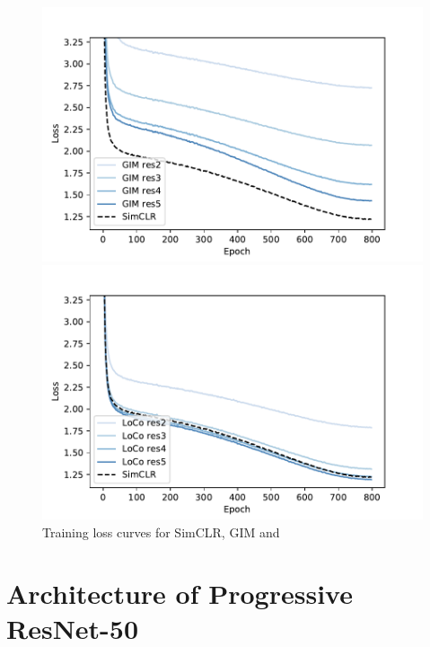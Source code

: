\else
    \begin{figure}[htbp]
    \centering
    \begin{minipage}[t]{0.48\linewidth}
    \includegraphics[width=1\linewidth, trim={0.3cm 0 1cm 0}, clip]{figures/simclr_vs_gim.pdf}
    \end{minipage}
    \hfill
    \begin{minipage}[t]{0.48\linewidth}
    \includegraphics[width=1\linewidth, trim={0.3cm 0 1cm 0}, clip]{figures/simclr_vs_ours.pdf}	
    \end{minipage}
    \caption{Training loss curves for SimCLR, GIM and \ours{}}
    \label{fig:loss_curve}
    \end{figure}
\fi


\section{Architecture of Progressive ResNet-50}

